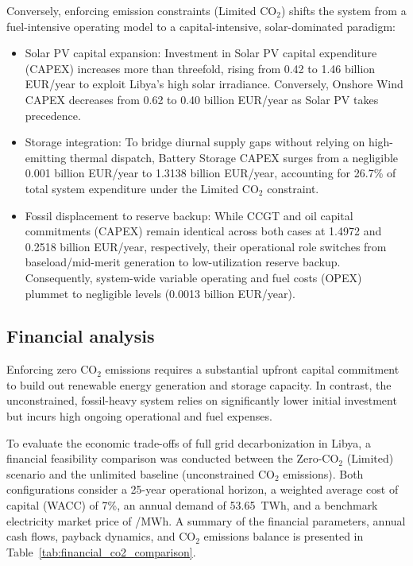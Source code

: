 \documentclass[preprint,12pt]{elsarticle}
\begin{document}
Conversely, enforcing emission constraints (Limited $\text{CO}_2$) shifts the system from a fuel-intensive operating model to a capital-intensive, solar-dominated paradigm:

\begin{itemize}
    \item {Solar PV capital expansion:} Investment in Solar PV capital expenditure (CAPEX) increases more than threefold, rising from 0.42 to 1.46 billion EUR/year to exploit Libya's high solar irradiance. Conversely, Onshore Wind CAPEX decreases from 0.62 to 0.40 billion EUR/year as Solar PV takes precedence.
    \item {Storage integration:} To bridge diurnal supply gaps without relying on high-emitting thermal dispatch, Battery Storage CAPEX surges from a negligible 0.001 billion EUR/year to 1.3138 billion EUR/year, accounting for 26.7\% of total system expenditure under the Limited $\text{CO}_2$ constraint.
    \item {Fossil displacement to reserve backup:} While CCGT and oil capital commitments (CAPEX) remain identical across both cases at 1.4972 and 0.2518 billion EUR/year, respectively, their operational role switches from baseload/mid-merit generation to low-utilization reserve backup. Consequently, system-wide variable operating and fuel costs (OPEX) plummet to negligible levels (0.0013 billion EUR/year).
\end{itemize}
\subsection{Financial analysis}
Enforcing zero $\text{CO}_2$ emissions requires a substantial upfront capital commitment to build out renewable energy generation and storage capacity. In contrast, the unconstrained, fossil-heavy system relies on significantly lower initial investment but incurs high ongoing operational and fuel expenses. 

To evaluate the economic trade-offs of full grid decarbonization in Libya, a financial feasibility comparison was conducted between the {Zero-$\text{CO}_2$ (Limited)} scenario and the unlimited baseline (unconstrained $\text{CO}_2$ emissions). Both configurations consider a 25-year operational horizon, a weighted average cost of capital (WACC) of 7\%, an annual demand of 53.65~TWh, and a benchmark electricity market price of /MWh. A summary of the financial parameters, annual cash flows, payback dynamics, and $\text{CO}_2$ emissions balance is presented in Table~\ref{tab:financial_co2_comparison}.
\end{document}
